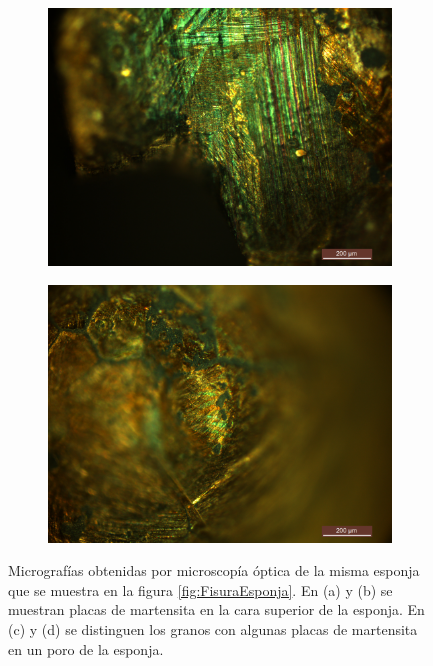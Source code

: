 \documentclass[a4paper,12pt,fleqn,twoside,openany]{book}
\begin{document}
\begin{figure}[h]
\begin{subfigure}{0.45\textwidth}
        \includegraphics[width=\textwidth]{Img/Introduccion/EspAMicro2.jpg}
        \caption{}
        \label{fig:EspAMicro2}
    \end{subfigure}
     \begin{subfigure}{0.45\textwidth}
        \includegraphics[width=\textwidth]{Img/Introduccion/EspAMicro3.jpg}
        \caption{}
        \label{fig:EspAMicro3}
    \end{subfigure}
 \caption{Micrografías obtenidas por microscopía óptica de la misma esponja que se muestra en la figura \ref{fig:FisuraEsponja}. En (a) y (b) se muestran placas de martensita en la cara superior de la esponja. En (c) y (d) se distinguen los granos con algunas placas de martensita en un poro de la esponja.}
  \label{fig:MicrografiasEsponja}
  \end{figure}
\end{document}
